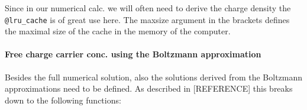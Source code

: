 \documentclass[11pt]{article}
\begin{document}
Since in our numerical calc. we will often need to derive the charge
density the \texttt{@lru\_cache} is of great use here. The maxsize
argument in the brackets defines the maximal size of the cache in the
memory of the computer.

    \hypertarget{free-charge-carrier-conc.-using-the-boltzmann-approximation}{%
\paragraph{Free charge carrier conc. using the Boltzmann
approximation}\label{free-charge-carrier-conc.-using-the-boltzmann-approximation}}

Besides the full numerical solution, also the solutions derived from the
Boltzmann approximations need to be defined. As described in
{[}REFERENCE{]} this breaks down to the following functions:
\end{document}
